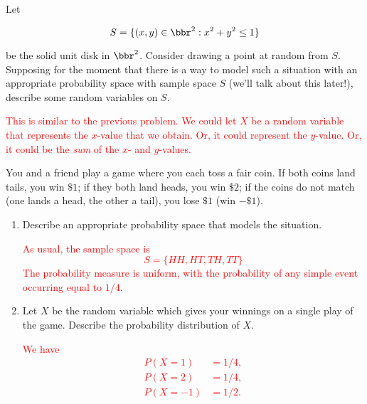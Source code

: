\documentclass[12pt,reqno]{amsart}
\begin{document}
\bigskip
\prob Let

    \[S = \{ (x,y) \in \bbr^2 : x^2+y^2 \leq 1\}\]

be the solid unit disk in $\bbr^2$. Consider drawing a point at random from $S$. Supposing for the moment that there is a way to model such a situation with an appropriate probability space with sample space $S$ (we'll talk about this later!), describe some random variables on $S$.


\bigskip
\textcolor{red}{This is similar to the previous problem. We could let $X$ be a random variable that represents the $x$-value that we obtain. Or, it could represent the $y$-value. Or, it could be the \textit{sum} of the $x$- and $y$-values.}
\bigskip






















\bigskip
\prob You and a friend play a game where you each toss a fair coin. If both coins land tails, you win $\$1$; if they both land heads, you win $\$2$; if the coins do not match (one lands a head, the other a tail), you lose $\$1$ (win $-\$1$).

\medskip
\begin{enumerate}
    \item Describe an appropriate probability space that models the situation.
    
    \bigskip
    \textcolor{red}{As usual, the sample space is
        \[S = \{HH,HT,TH,TT\}\]
    The probability measure is uniform, with the probability of any simple event occurring equal to $1/4$.}
    \bigskip

    \item Let $X$ be the random variable which gives your winnings on a single play of the game. Describe the probability distribution of $X$.
    
    \bigskip
    \textcolor{red}{We have
    \begin{align*}
    P(X=1) &= 1/4, \\
    P(X=2) &= 1/4, \\
    P(X=-1) &= 1/2.
    \end{align*}}
\end{enumerate}
\end{document}
